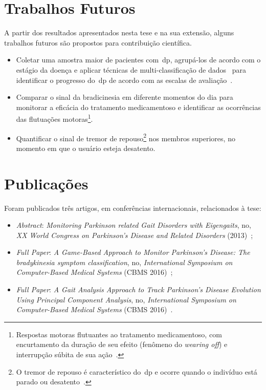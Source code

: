 \section{Trabalhos Futuros}\label{section:trabalhos_futuros}
A partir dos resultados apresentados nesta tese e na sua extensão, alguns trabalhos futuros são propostos para contribuição científica.

\begin{itemize}
	\item Coletar uma amostra maior de pacientes com~\ac{dp}, agrupá-los de acordo com o estágio da doença e aplicar técnicas de multi-classificação de dados~\cite{multisvm2011} para identificar o progresso do~\ac{dp} de acordo com as escalas de avaliação~\cite{goul05}.
	\item Comparar o sinal da bradicinesia em diferente momentos do dia para monitorar a eficácia do tratamento medicamentoso e identificar as ocorrências das flutuações motoras\footnote{Respostas motoras flutuantes ao tratamento medicamentoso, com encurtamento da duração de seu efeito (fenômeno do \textit{wearing off}) e interrupção súbita de sua ação~\cite{protpar010}.}.
	\item Quantificar o sinal de tremor de repouso\footnote{O tremor de repouso é característico do~\ac{dp} e ocorre quando o indivíduo está parado ou desatento~\cite{protpar010}.} nos membros superiores, no momento em que o usuário esteja desatento.
	\end{itemize}



\section{Publicações}\label{section:publicacoes}
Foram publicados três artigos, em conferências internacionais, relacionados à tese: 
  \begin{itemize}
   \item \textit{Abstract}: \textit{Monitoring Parkinson related Gait Disorders with Eigengaits}, no, \textit{XX World Congress on Parkinson's Disease and Related Disorders} (2013)~\cite{lmmeigengaits2013};
   \item \textit{Full Paper}: \textit{A Game-Based Approach to Monitor Parkinson’s Disease: The bradykinesia symptom classification}, no, \textit{International Symposium on Computer-Based Medical Systems} (CBMS 2016)~\cite{lmmcbmsgame2016};
   \item \textit{Full Paper}: \textit{A Gait Analysis Approach to Track Parkinson’s Disease Evolution Using Principal Component Analysis}, no, \textit{International Symposium on Computer-Based Medical Systems} (CBMS 2016)~\cite{lmmcbmsgait2016}.
  \end{itemize}




